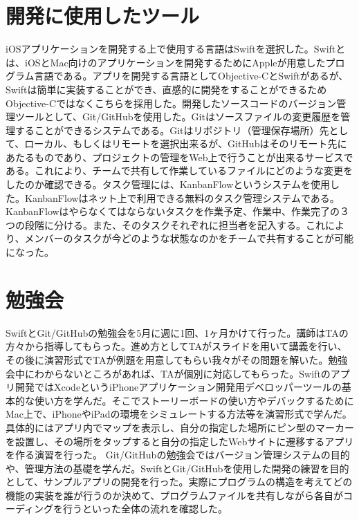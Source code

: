 \section{開発に使用したツール}

iOSアプリケーションを開発する上で使用する言語はSwiftを選択した。Swiftとは、iOSとMac向けのアプリケーションを開発するためにAppleが用意したプログラム言語である。アプリを開発する言語としてObjective-CとSwiftがあるが、
Swiftは簡単に実装することができ、直感的に開発をすることができるためObjective-Cではなくこちらを採用した。開発したソースコードのバージョン管理ツールとして、Git/GitHubを使用した。Gitはソースファイルの変更履歴を管理することができるシステムである。Gitはリポジトリ（管理保存場所）先として、ローカル、もしくはリモートを選択出来るが、GitHubはそのリモート先にあたるものであり、プロジェクトの管理をWeb上で行うことが出来るサービスである。これにより、チームで共有して作業しているファイルにどのような変更をしたのか確認できる。タスク管理には、KanbanFlowというシステムを使用した。KanbanFlowはネット上で利用できる無料のタスク管理システムである。KanbanFlowはやらなくてはならないタスクを作業予定、作業中、作業完了の３つの段階に分ける。また、そのタスクそれぞれに担当者を記入する。これにより、メンバーのタスクが今どのような状態なのかをチームで共有することが可能になった。

\section{勉強会}
SwiftとGit/GitHubの勉強会を5月に週に1回、1ヶ月かけて行った。講師はTAの方々から指導してもらった。進め方としてTAがスライドを用いて講義を行い、その後に演習形式でTAが例題を用意してもらい我々がその問題を解いた。勉強会中にわからないところがあれば、TAが個別に対応してもらった。Swiftのアプリ開発ではXcodeというiPhoneアプリケーション開発用デベロッパーツールの基本的な使い方を学んだ。そこでストーリーボードの使い方やデバックするためにMac上で、iPhoneやiPadの環境をシミュレートする方法等を演習形式で学んだ。具体的にはアプリ内でマップを表示し、自分の指定した場所にピン型のマーカーを設置し、その場所をタップすると自分の指定したWebサイトに遷移するアプリを作る演習を行った。
Git/GitHubの勉強会ではバージョン管理システムの目的や、管理方法の基礎を学んだ。SwiftとGit/GitHubを使用した開発の練習を目的として、サンプルアプリの開発を行った。実際にプログラムの構造を考えてどの機能の実装を誰が行うのか決めて、プログラムファイルを共有しながら各自がコーディングを行うといった全体の流れを確認した。

